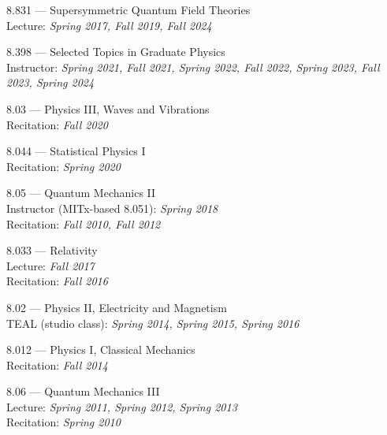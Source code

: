 \bbl
\item 8.831 --- Supersymmetric Quantum Field Theories
\\ Lecture: \emph{Spring 2017, Fall 2019, Fall 2024}
\item 8.398 --- Selected Topics in Graduate Physics
\\ Instructor: \emph{Spring 2021, Fall 2021, Spring 2022, Fall 2022, Spring 2023, Fall 2023, Spring 2024}
\item 8.03 --- Physics III, Waves and Vibrations
\\ Recitation: \emph{Fall 2020}
\item 8.044 --- Statistical Physics I
\\ Recitation: \emph{Spring 2020}
\item 8.05 --- Quantum Mechanics II
\\ Instructor (MITx-based 8.051): \emph{Spring 2018}
\\ Recitation: \emph{Fall 2010, Fall 2012}
\item 8.033 --- Relativity
\\ Lecture: \emph{Fall 2017}
\\ Recitation: \emph{Fall 2016}
\item 8.02 --- Physics II, Electricity and Magnetism
\\ TEAL (studio class): \emph{Spring 2014, Spring 2015, Spring 2016}
\item 8.012 --- Physics I, Classical Mechanics
\\ Recitation: \emph{Fall 2014}
\item 8.06 --- Quantum Mechanics III
\\ Lecture: \emph{Spring 2011, Spring 2012, Spring 2013}
\\ Recitation: \emph{Spring 2010}
\el
